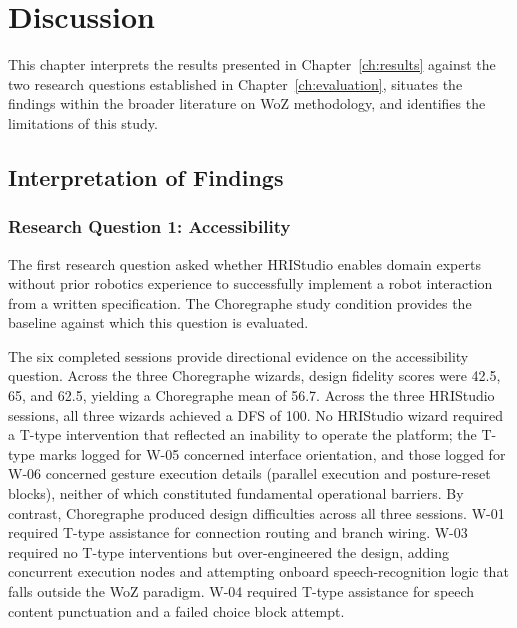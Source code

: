 \chapter{Discussion}
\label{ch:discussion}

This chapter interprets the results presented in Chapter~\ref{ch:results} against the two research questions established in Chapter~\ref{ch:evaluation}, situates the findings within the broader literature on WoZ methodology, and identifies the limitations of this study.

\section{Interpretation of Findings}

\subsection{Research Question 1: Accessibility}

The first research question asked whether HRIStudio enables domain experts without prior robotics experience to successfully implement a robot interaction from a written specification. The Choregraphe study condition provides the baseline against which this question is evaluated.

The six completed sessions provide directional evidence on the accessibility question. Across the three Choregraphe wizards, design fidelity scores were 42.5, 65, and 62.5, yielding a Choregraphe mean of 56.7. Across the three HRIStudio sessions, all three wizards achieved a DFS of 100. No HRIStudio wizard required a T-type intervention that reflected an inability to operate the platform; the T-type marks logged for W-05 concerned interface orientation, and those logged for W-06 concerned gesture execution details (parallel execution and posture-reset blocks), neither of which constituted fundamental operational barriers. By contrast, Choregraphe produced design difficulties across all three sessions. W-01 required T-type assistance for connection routing and branch wiring. W-03 required no T-type interventions but over-engineered the design, adding concurrent execution nodes and attempting onboard speech-recognition logic that falls outside the WoZ paradigm. W-04 required T-type assistance for speech content punctuation and a failed choice block attempt.

